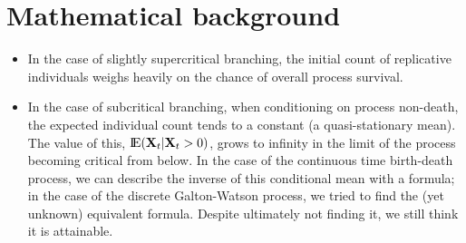 

%
%
%
%
%














































\chapter{Mathematical background}


\begin{itemize}
\item In the case of slightly supercritical branching,  the initial count of replicative individuals weighs heavily on the chance of overall process survival.

\item In the case of subcritical branching,  when conditioning on process non-death, the expected individual count tends to a constant (a quasi-stationary mean).  The value of this, ${\rm I}\!{\rm E}({{\bf X}_t}| {{\bf X}_t}>0)$, grows to infinity in the limit of the process becoming critical from below.  In the case of the continuous time birth-death process, we can describe the inverse of this conditional mean with a formula; in the case of the discrete Galton-Watson process,  we tried to find the (yet unknown) equivalent formula.  Despite ultimately not finding it, we still think it is attainable.  
\end{itemize}





